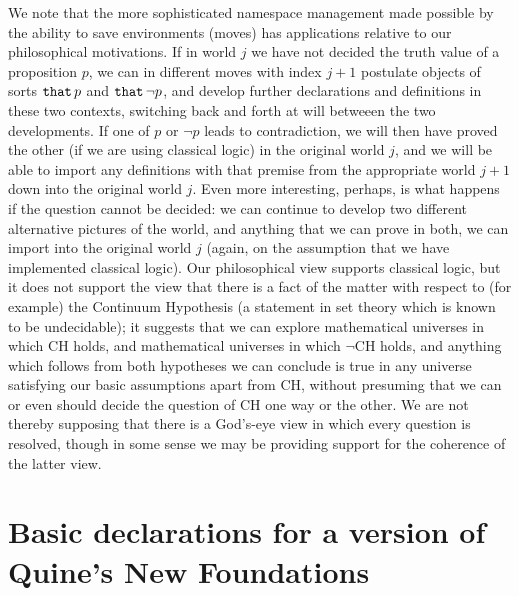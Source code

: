 \documentclass[12pt]{article}
\begin{document}
We note that the more sophisticated namespace management made possible by the ability to save environments (moves) has applications relative to our philosophical motivations.  If in world $j$ we have not decided the truth value of a proposition $p$, we can in different moves with index $j+1$ postulate objects of sorts  ${\tt that}\, p$ and ${\tt that} \,\neg p$, and develop further declarations and definitions in these two contexts, switching back and forth at will betweeen the two developments.  If one of $p$ or $\neg p$ leads to contradiction, we will then have proved the other (if we are using classical logic) in the original world $j$, and we will be able to import any definitions with that premise from the appropriate world $j+1$ down into the original world $j$.  Even more interesting, perhaps, is what happens if the question cannot be decided:  we can continue to develop two different alternative pictures of the world, and anything that we can prove in both, we can import into the original world $j$ (again, on the assumption that we have implemented classical logic).  Our philosophical view supports classical logic, but it does not support the view that there is a fact of the matter with respect to (for example) the Continuum Hypothesis (a statement in set theory which is known to be undecidable);  it suggests that we can explore mathematical universes in which CH holds, and mathematical universes in which $\neg$CH holds, and anything which follows from both hypotheses we can conclude is true in any universe satisfying our basic assumptions apart from CH, without presuming that we can or even should decide the question of CH one way or the other.  We are not thereby supposing that there is a God's-eye view in which every question is resolved, though in some sense we may be providing support for the coherence of the latter view.

\section{Basic declarations for a version of Quine's New Foundations}
\end{document}
